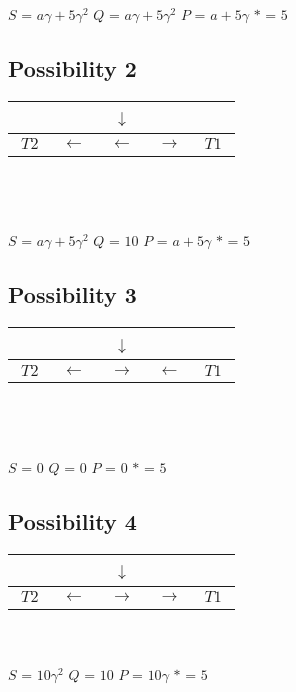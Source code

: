 \documentclass{article}
\begin{document}
$S$ = $a\gamma+5\gamma^{2}$
\space\space 
$Q$ = $a\gamma+5\gamma^{2}$ 
\space\space
$P$ = $a+5\gamma$
\space\space
$*$ = $5$

\subsection{Possibility 2}

\begin{tabular}{|c|c|c|c|c|}
\hline 
~~~ & ~~~ & ~$\downarrow$~ & ~~~ & ~~~\tabularnewline
\hline 
\hline 
$T2$ & $\begin{array}{c}
\leftarrow\end{array}$ & $\leftarrow$ & $\rightarrow$ & $T1$\tabularnewline
\hline 
\end{tabular}\\
\\\\
\space\space $S$ = $a\gamma+5\gamma^{2}$
\space\space 
$Q$ = $10$
\space\space 
$P$ = $a+5\gamma$
\space\space 
$*$ = $5$


\subsection{Possibility 3}

\begin{tabular}{|c|c|c|c|c|}
\hline 
~~~ & ~~~ & ~$\downarrow$~ & ~~~ & ~~~\tabularnewline
\hline 
\hline 
$T2$ & $\begin{array}{c}
\leftarrow\end{array}$ & $\rightarrow$ & $\leftarrow$ & $T1$\tabularnewline
\hline 
\end{tabular}\\
\\\\
\space\space
$S$ = $0$
\space\space
$Q$ = $0$
\space\space
$P$ = $0$
\space\space
$*$ = $5$


\subsection{Possibility 4}

\begin{tabular}{|c|c|c|c|c|}
\hline 
~~~ & ~~~ & ~$\downarrow$~ & ~~~ & ~~~\tabularnewline
\hline 
\hline 
$T2$ & $\begin{array}{c}
\leftarrow\end{array}$ & $\rightarrow$ & $\rightarrow$ & $T1$\tabularnewline
\hline 
\end{tabular}\\
\\
\space\space
$S$ = $10\gamma^{2}$
\space\space	
$Q$ = $10$ 
\space\space
$P$ = $10\gamma$
\space\space
$*$ = $5$
\end{document}
